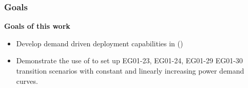 \begin{frame}
    \frametitle{Goals}
    \textbf{Goals of this work} 
    \begin{itemize}
        \item Develop demand driven deployment capabilities in \Cyclus (\deploy)
        \item Demonstrate the use of \deploy to set up EG01-23, EG01-24, EG01-29
        EG01-30 transition scenarios with constant and linearly increasing 
        power demand curves. 
    \end{itemize}

\end{frame}
